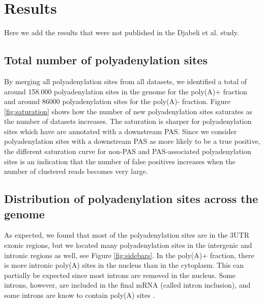 \section{Results}
Here we add the results that were not published in the Djabeli et al. study.

\subsection{Total number of polyadenylation sites}
By merging all polyadenylation sites from all datasets, we identified a total
of around 158.000 polyadenylation sites in the genome for the poly(A)+ fraction
and around 86000 polyadenylation sites for the poly(A)- fraction. Figure
\ref{fig:saturation} shows how the number of new polyadenylation sites
saturates as the number of datasets increases. The saturation is sharper for
polyadenylation sites which have are annotated with a downstream PAS. Since we
consider polyadenylation sites with a downstream PAS as more likely to be a
true positive, the different saturation curve for non-PAS and PAS-associated
polyadenylation sites is an indication that the number of false positives
increases when the number of clustered reads becomes very large. 

\subsection{Distribution of polyadenylation sites across the genome}
As expected, we found that most of the polyadenylation sites are in the 3\p UTR
exonic regions, but we located many polyadenylation sites in the intergenic
and intronic regions as well, see Figure \ref{fig:sidebars}. In the poly(A)+
fraction, there is more intronic poly(A) sites in the nucleus than in the
cytoplasm. This can partially be expected since most introns are removed in the
nucleus. Some introns, however, are included in the final mRNA (called intron
inclusion), and some introns are know to contain poly(A) sites
\cite{tian_widespread_2007}. 

